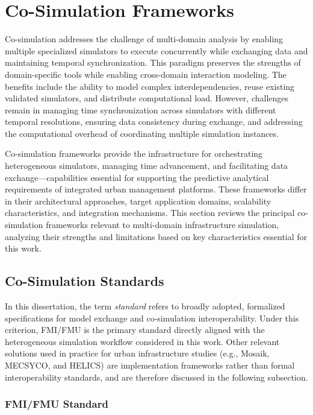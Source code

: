 \section{Co-Simulation Frameworks}

Co-simulation addresses the challenge of multi-domain analysis by enabling multiple specialized simulators to execute concurrently while exchanging data and maintaining temporal synchronization. This paradigm preserves the strengths of domain-specific tools while enabling cross-domain interaction modeling. The benefits include the ability to model complex interdependencies, reuse existing validated simulators, and distribute computational load. However, challenges remain in managing time synchronization across simulators with different temporal resolutions, ensuring data consistency during exchange, and addressing the computational overhead of coordinating multiple simulation instances.

Co-simulation frameworks provide the infrastructure for orchestrating heterogeneous simulators, managing time advancement, and facilitating data exchange—capabilities essential for supporting the predictive analytical requirements of integrated urban management platforms. These frameworks differ in their architectural approaches, target application domains, scalability characteristics, and integration mechanisms. This section reviews the principal co-simulation frameworks relevant to multi-domain infrastructure simulation, analyzing their strengths and limitations based on key characteristics essential for this work.


\subsection{Co-Simulation Standards}

In this dissertation, the term \textit{standard} refers to broadly adopted, formalized specifications for model exchange and co-simulation interoperability. Under this criterion, FMI/FMU is the primary standard directly aligned with the heterogeneous simulation workflow considered in this work. Other relevant solutions used in practice for urban infrastructure studies (e.g., Mosaik, MECSYCO, and HELICS) are implementation frameworks rather than formal interoperability standards, and are therefore discussed in the following subsection.

\subsubsection{FMI/FMU Standard}

